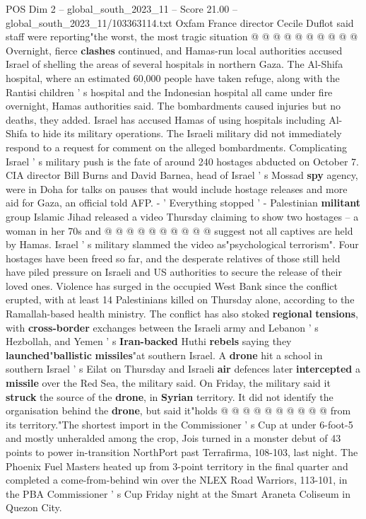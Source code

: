 \begin{textsample}{POS Dim 2 – global\_south\_2023\_11 – Score 21.00 – global\_south\_2023\_11/103363114.txt}
Oxfam France director Cecile Duflot said staff were reporting"the worst, the most tragic situation @ @ @ @ @ @ @ @ @ @ Overnight, fierce \textbf{clashes} continued, and Hamas-run local authorities accused Israel of shelling the areas of several hospitals in northern Gaza.
The Al-Shifa hospital, where an estimated 60,000 people have taken refuge, along with the Rantisi children ' s hospital and the Indonesian hospital all came under fire overnight, Hamas authorities said.
The bombardments caused injuries but no deaths, they added.
Israel has accused Hamas of using hospitals including Al-Shifa to hide its military operations.
The Israeli military did not immediately respond to a request for comment on the alleged bombardments.
Complicating Israel ' s military push is the fate of around 240 hostages abducted on October 7.
CIA director Bill Burns and David Barnea, head of Israel ' s Mossad \textbf{spy} agency, were in Doha for talks on pauses that would include hostage releases and more aid for Gaza, an official told AFP. - ' Everything stopped ' - Palestinian \textbf{militant} group Islamic Jihad released a video Thursday claiming to show two hostages -- a woman in her 70s and @ @ @ @ @ @ @ @ @ @ suggest not all captives are held by Hamas.
Israel ' s military slammed the video as"psychological terrorism".
Four hostages have been freed so far, and the desperate relatives of those still held have piled pressure on Israeli and US authorities to secure the release of their loved ones.
Violence has surged in the occupied West Bank since the conflict erupted, with at least 14 Palestinians killed on Thursday alone, according to the Ramallah-based health ministry.
The conflict has also stoked \textbf{regional} \textbf{tensions}, with \textbf{cross-border} exchanges between the Israeli army and Lebanon ' s Hezbollah, and Yemen ' s \textbf{Iran-backed} Huthi \textbf{rebels} saying they \textbf{launched}"\textbf{ballistic} \textbf{missiles}"at southern Israel.
A \textbf{drone} hit a school in southern Israel ' s Eilat on Thursday and Israeli \textbf{air} defences later \textbf{intercepted} a \textbf{missile} over the Red Sea, the military said.
On Friday, the military said it \textbf{struck} the source of the \textbf{drone}, in \textbf{Syrian} territory.
It did not identify the organisation behind the \textbf{drone}, but said it"holds @ @ @ @ @ @ @ @ @ @ from its territory."The shortest import in the Commissioner ' s Cup at under 6-foot-5 and mostly unheralded among the crop, Jois turned in a monster debut of 43 points to power in-transition NorthPort past Terrafirma, 108-103, last night.
The Phoenix Fuel Masters heated up from 3-point territory in the final quarter and completed a come-from-behind win over the NLEX Road Warriors, 113-101, in the PBA Commissioner ' s Cup Friday night at the Smart Araneta Coliseum in Quezon City.

\end{textsample}
